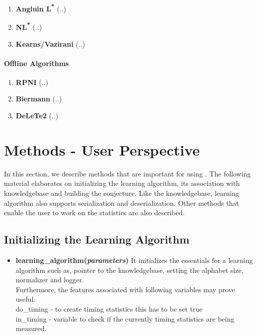 \begin{enumerate}
 \item \textbf{Angluin L\textsuperscript{*}} \cite{36889-angluin1} \cite{181015-angluin2} \cite{640230-angluin3}
	(..)
 \item \textbf{NL\textsuperscript{*}} \cite{DBLP:conf/ijcai/BolligHKL09-nl1} \cite{DBLP:conf/wia/GarciaRCA05-nl2}
	(..)
 \item \textbf{Kearns/Vazirani} \cite{DBLP:conf/nips/CrammerKW06-Kearns1} \cite{DBLP:conf/nips/LittmanKS01-kearns2} \cite{200548-kearns3}
	(..)
\end{enumerate}

\paragraph{Offline Algorithms}

\begin{enumerate}
 \item \textbf{RPNI} \cite{DBLP:conf/aia/Hoffmann07-rpni1} \cite{599647-rpni2} \cite{655948-rpni3} \cite{1434324-rpni4}
	(..)
 \item \textbf{Biermann} \cite{17952-biermann1}
	(..)
 \item \textbf{DeLeTe2} \cite{982366-delete1}
	(..)
\end{enumerate}

\section{Methods - User Perspective}

In this section, we describe methods that are important for using \libalf. The following material elaborates on initializing the learning algorithm, its association with knowledgebase and building the conjecture. Like the knowledgebase, learning algorithm also supports serialization and deserialization. Other methods that enable the user to work on the statistics are also described.

\subsection*{Initializing the Learning Algorithm}

\begin{itemize}
 \item \textbf{learning\_algorithm(\emph{parameters})} \vskip 1pt
	It initializes the essentials for a learning algorithm such as, pointer to the knowledgebase, setting the alphabet size, normalizer and logger. \\ Furthermore, the features associated with following variables may prove useful. \\
	do\_timing - to create timing statistics this has to be set true \\
	in\_timing - variable to check if the currently timing statistics are being measured. \\
\end{itemize}

